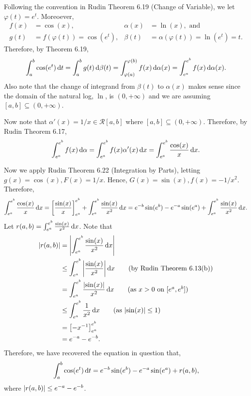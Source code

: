\documentclass[12pt]{article}
\begin{document}
\begin{fproof}[1(a)]
    Following the convention in Rudin Theorem 6.19 (Change of Variable), we let \(\varphi(t) = e^t\).
    Moreoever,
    \begin{align*}
        f(x) &= \cos(x), &\alpha(x) &= \ln(x), \text{ and }\\
        g(t) &= f(\varphi(t)) = \cos(e^t)
        , &\beta(t) &= \alpha(\varphi(t)) = \ln(e^t) = t.
    \end{align*}
    Therefore, by Theorem 6.19,
    \begin{align*}
        \int_{a}^{b} \cos(e^t) \mathop{}\!\mathrm{d} t = \int_{a}^{b} g(t)\mathop{}\!\mathrm{d}\beta(t) = \int_{\varphi(a)}^{\varphi(b)} f(x) \mathop{}\!\mathrm{d}\alpha(x) = \int_{e^a}^{e^b} f(x) \mathop{}\!\mathrm{d}\alpha(x).
    \end{align*}
    Also note that the change of integrand from \(\beta(t)\) to \(\alpha(x)\) makes sense since the domain of the natural log, \(\ln\), is \((0,+\infty)\) and we are assuming \([a,b] \subseteq (0,+\infty)\).

    Now note that \(\alpha'(x) = 1/x \in \mathcal{R}[a,b]\) where \([a,b] \subseteq  (0, +\infty)\).
    Therefore, by Rudin Theorem 6.17,
    \begin{align*}
         \int_{e^a}^{e^b} f(x) \mathop{}\!\mathrm{d}\alpha = \int_{e^a}^{e^b} f(x) \alpha'(x) \mathop{}\!\mathrm{d} x = \int_{e^a}^{e^b} \frac{\cos(x)}{x} \mathop{}\!\mathrm{d} x.
    \end{align*}

    Now we apply Rudin Theorem 6.22 (Integration by Parts),
    letting \(g(x) = \cos(x), F(x) = 1/x\).
    Hence, \(G(x) = \sin(x), f(x) = -1/x^2\).
    Therefore,
    \begin{align*}
        \int_{e^a}^{e^b} \frac{\cos(x)}{x} \mathop{}\!\mathrm{d} x = \left[ \frac{\sin(x)}{x} \right]_{e^a}^{e^b} + \int_{e^a}^{e^b} \frac{\sin(x)}{x^2} \mathop{}\!\mathrm{d} x = e^{-b}\sin(e^b) - e^{-a}\sin(e^a) + \int_{e^a}^{e^b} \frac{\sin(x)}{x^2} \mathop{}\!\mathrm{d} x.
    \end{align*}
    Let \(r(a,b) = \int_{e^a}^{e^b} \frac{\sin(x)}{x^2} \mathop{}\!\mathrm{d} x\).
    Note that
    \begin{align*}
        \abs{r(a,b)}& = \abs{\int_{e^a}^{e^b} \frac{\sin(x)}{x^2} \dx} \\
        & \leq \int_{e^a}^{e^b} \abs{\frac{\sin(x)}{x^2}} \dx \tag{by Rudin Theorem 6.13(b)}\\
        & = \int_{e^a}^{e^b} \frac{\abs{\sin(x)}}{x^2} \dx \tag{as \(x > 0\) on \([e^a, e^b]\)}\\
        &\leq \int_{e^a}^{e^b} \frac{1}{x^2}\dx \tag{as \(\abs{\sin(x)} \leq 1\)}\\
        &=\brac{-x^{-1}}_{e^a}^{e^b}\\
        &=e^{-a} - e^{-b}.
    \end{align*}
    Therefore, we have recovered the equation in question that,
    \begin{align*}
        \int_{a}^{b} \cos(e^t)\mathop{}\!\mathrm{d} t = e^{-b}\sin(e^{b}) - e^{-a}\sin(e^a) + r(a,b),
    \end{align*}
    where \(\left\lvert r(a,b) \right\rvert \leq e^{-a} - e^{-b}\).
\end{fproof}
\end{document}
